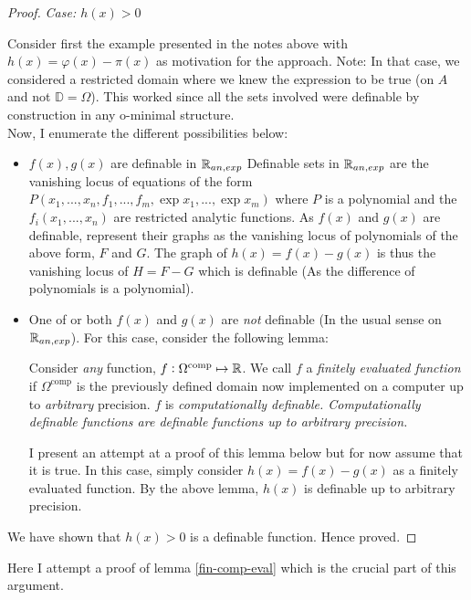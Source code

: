 \begin{proof}
    \textit{Case: $h(x) > 0$}
    \par Consider first the example presented in the notes above with $h(x) = \varphi(x) - \pi(x)$ as motivation for the approach. Note: In that case, we considered a restricted domain where we knew the expression to be true (on $A$ and not $\mathbb{D} = \Omega$). This worked since all the sets involved were definable by construction in any o-minimal structure.\\
    Now, I enumerate the different possibilities below:
    \begin{itemize}
        \item $f(x), g(x)$ are definable in $\mathbb{R}_{an,exp}$
        Definable sets in $\mathbb{R}_{an,exp}$ are the vanishing locus of equations of the form 
        $P(x_1, ..., x_n, f_1,..., f_m, \exp{x_1},..., \exp{x_m})$ where $P$ is a polynomial and the $f_i(x_1,...,x_n)$ are restricted analytic functions. As $f(x)$ and $g(x)$ are definable, represent their graphs as the vanishing locus of polynomials of the above form, $F$ and $G$. The graph of $h(x) = f(x) - g(x)$ is thus the vanishing locus of $H = F - G$ which is definable (As the difference of polynomials is a polynomial).
        \item One of or both $f(x)$ and $g(x)$ are \textit{not} definable (In the usual sense on $\mathbb{R}_{an,exp}$).
        For this case, consider the following lemma:

        \begin{lemma}
        \label{fin-comp-eval}
            Consider \textit{any} function, $f:\Omega^\text{comp}\mapsto\mathbb{R}$. We call $f$ a \textit{finitely evaluated function} if $\Omega^\text{comp}$ is the previously defined domain now implemented on a computer up to \textit{arbitrary} precision. $f$ is \textit{computationally definable. Computationally definable functions are definable functions up to arbitrary precision.}
        \end{lemma}
        I present an attempt at a proof of this lemma below but for now assume that it is true. In this case, simply consider $h(x) = f(x) - g(x)$ as a finitely evaluated function. By the above lemma, $h(x)$ is definable up to arbitrary precision.
    \end{itemize}
    We have shown that $h(x) > 0$ is a definable function. Hence proved.
\end{proof}

Here I attempt a proof of lemma \ref{fin-comp-eval} which is the crucial part of this argument.

